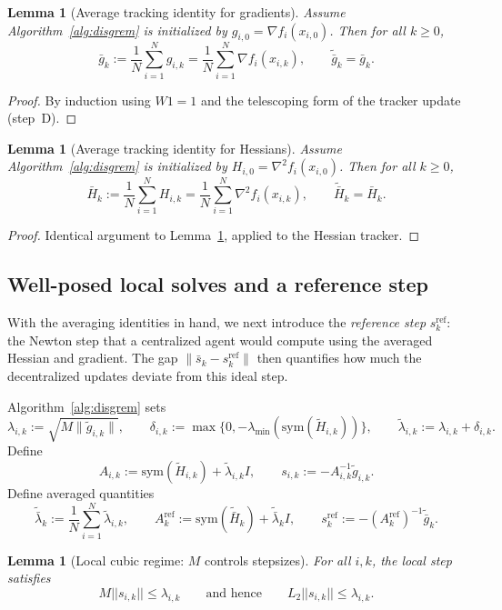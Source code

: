 \documentclass[11pt,a4paper]{article}
\def\one{1}%
\def\norm#1{||#1||}%
\newtheorem{lemma}[theorem]{Lemma}
\newcommand{\one}{\mathbf{1}}
\newcommand{\norm}[1]{\left\|#1\right\|}
\begin{document}
\begin{lemma}[Average tracking identity for gradients]\label{lem:avg-track-g}
Assume Algorithm~\ref{alg:disgrem} is initialized by $g_{i,0}=\nabla f_i(x_{i,0})$.
Then for all $k\ge0$,
\[
\bar g_k:=\frac1N\sum_{i=1}^N g_{i,k}=\frac1N\sum_{i=1}^N\nabla f_i(x_{i,k}),
\qquad
\tilde{\bar g}_k=\bar g_k.
\]
\end{lemma}
\begin{proof}
By induction using $W\one=\one$ and the telescoping form of the tracker update (step~D).
\end{proof}

\begin{lemma}[Average tracking identity for Hessians]\label{lem:avg-track-h}
Assume Algorithm~\ref{alg:disgrem} is initialized by $H_{i,0}=\nabla^2 f_i(x_{i,0})$.
Then for all $k\ge0$,
\[
\bar H_k:=\frac1N\sum_{i=1}^N H_{i,k}=\frac1N\sum_{i=1}^N\nabla^2 f_i(x_{i,k}),
\qquad
\tilde{\bar H}_k=\bar H_k.
\]
\end{lemma}
\begin{proof}
Identical argument to Lemma~\ref{lem:avg-track-g}, applied to the Hessian tracker.
\end{proof}

\subsection{Well-posed local solves and a reference step}\label{ssec:refstep}
With the averaging identities in hand, we next introduce the
\emph{reference step} $s_k^{\mathrm{ref}}$: the Newton step that a
centralized agent would compute using the averaged Hessian and gradient.
The gap $\|\bar s_k - s_k^{\mathrm{ref}}\|$ then quantifies how much the
decentralized updates deviate from this ideal step.

Algorithm~\ref{alg:disgrem} sets
\[
\lambda_{i,k}:=\sqrt{M\|\tilde g_{i,k}\|},\qquad
\delta_{i,k}:=\max\{0,-\lambda_{\min}(\mathrm{sym}(\tilde H_{i,k}))\},\qquad
\tilde\lambda_{i,k}:=\lambda_{i,k}+\delta_{i,k}.
\]
Define
\[
A_{i,k}:=\mathrm{sym}(\tilde H_{i,k})+\tilde\lambda_{i,k}I,
\qquad
s_{i,k}:=-A_{i,k}^{-1}\tilde g_{i,k}.
\]
Define averaged quantities
\[
\tilde{\bar\lambda}_k:=\frac1N\sum_{i=1}^N \tilde\lambda_{i,k},
\qquad
A_k^{\mathrm{ref}}:=\mathrm{sym}(\tilde{\bar H}_k)+\tilde{\bar\lambda}_k I,
\qquad
s_k^{\mathrm{ref}}:=-(A_k^{\mathrm{ref}})^{-1}\tilde{\bar g}_k.
\]

\begin{lemma}[Local cubic regime: $M$ controls stepsizes]\label{lem:M-vs-s}
For all $i,k$, the local step satisfies
\[
M\norm{s_{i,k}}\le \lambda_{i,k}
\qquad\text{and hence}\qquad
L_2\norm{s_{i,k}}\le \lambda_{i,k}.
\]
\end{lemma}
\end{document}
